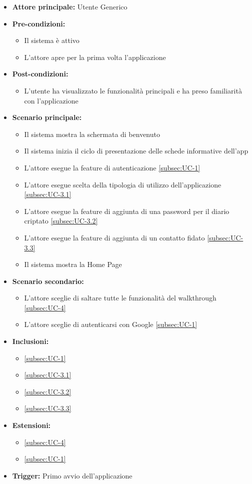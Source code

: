 \documentclass[a4paper,12pt]{article}
\begin{document}
\begin{itemize}
    \item \textbf{Attore principale:} Utente Generico
    \item \textbf{Pre-condizioni:}
    \begin{itemize}
        \item Il sistema è attivo
        \item L'attore apre per la prima volta l’applicazione
    \end{itemize}
    \item \textbf{Post-condizioni:}
    \begin{itemize}
        \item L’utente ha visualizzato le funzionalità principali e ha preso familiarità con l'applicazione
    \end{itemize}
    \item \textbf{Scenario principale:}
    \begin{itemize}
        \item Il sistema mostra la schermata di benvenuto
        \item Il sistema inizia il ciclo di presentazione delle schede informative dell'app
        \item L'attore esegue la feature di autenticazione \ref{subsec:UC-1}
        \item L'attore esegue scelta della tipologia di utilizzo dell'applicazione \ref{subsec:UC-3.1}
        \item L'attore esegue la feature di aggiunta di una password per il diario criptato \ref{subsec:UC-3.2}
        \item L'attore esegue la feature di aggiunta di un contatto fidato \ref{subsec:UC-3.3}
        \item Il sistema mostra la Home Page
    \end{itemize}
    \item \textbf{Scenario secondario:}
    \begin{itemize}
        \item L'attore sceglie di saltare tutte le funzionalità del walkthrough \ref{subsec:UC-4}
        \item L'attore sceglie di autenticarsi con Google \ref{subsec:UC-1}
    \end{itemize} 
    \item \textbf{Inclusioni:}
    \begin{itemize}
        \item \ref{subsec:UC-1}
        \item \ref{subsec:UC-3.1}
        \item \ref{subsec:UC-3.2}
        \item \ref{subsec:UC-3.3}
    \end{itemize}
    \item \textbf{Estensioni:}
    \begin{itemize}
        \item \ref{subsec:UC-4}
        \item \ref{subsec:UC-1}
    \end{itemize}
    \item \textbf{Trigger:} Primo avvio dell'applicazione
\end{itemize}
\end{document}
